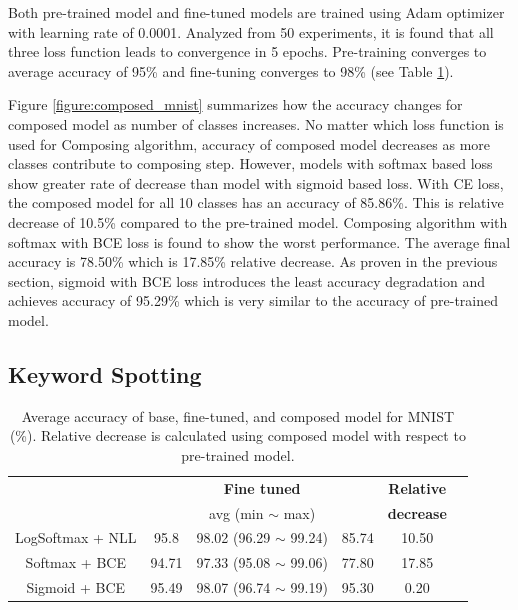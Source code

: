 \documentclass{article}
\begin{document}
Both pre-trained model and fine-tuned models are trained using Adam optimizer with learning rate of 0.0001. Analyzed from 50 experiments, it is found that all three loss function leads to convergence in 5 epochs. Pre-training converges to average accuracy of 95\% and fine-tuning converges to 98\% (see Table \ref{table:mnist}).

Figure \ref{figure:composed_mnist} summarizes how the accuracy changes for composed model as number of classes increases. No matter which loss function is used for Composing algorithm, accuracy of composed model decreases as more classes contribute to composing step. However, models with softmax based loss show greater rate of decrease than model with sigmoid based loss. With CE loss, the composed model for all 10 classes has an accuracy of 85.86\%. This is relative decrease of 10.5\% compared to the pre-trained model. Composing algorithm with softmax with BCE loss is found to show the worst performance. The average final accuracy is 78.50\% which is 17.85\% relative decrease. As proven in the previous section, sigmoid with BCE loss introduces the least accuracy degradation and achieves accuracy of 95.29\% which is very similar to the accuracy of pre-trained model.

\subsection{Keyword Spotting}


\begin{table}[t]
    \centering
    \begin{tabular}{cccccc}
        \toprule[1pt]
        \multirow{2}{*}{\raisebox{-3\heavyrulewidth}{\bf Loss function}} &
        \multirow{2}{*}{\raisebox{-3\heavyrulewidth}{\bf Pre-trained }} &
        \textbf{Fine tuned} &
        \multirow{2}{*}{\raisebox{-3\heavyrulewidth}{ \bf Composed }} &
        \textbf{ Relative } \\
        & & avg (min $\sim$ max) & & \textbf{ decrease } \\
        \midrule
        LogSoftmax + NLL & 95.8 & 98.02 (96.29 $\sim$ 99.24) & 85.74 & 10.50 \\
        Softmax + BCE & 94.71 & 97.33 (95.08 $\sim$ 99.06) & 77.80 & 17.85 \\
        Sigmoid + BCE & 95.49 & 98.07 (96.74 $\sim$ 99.19) & 95.30 & 0.20 \\
        \bottomrule[1pt]
    \end{tabular}
    \caption{Average accuracy of base, fine-tuned, and composed model for MNIST (\%). Relative decrease is calculated using composed model with respect to pre-trained model.}
    \label{table:mnist}
\end{table}
\end{document}
